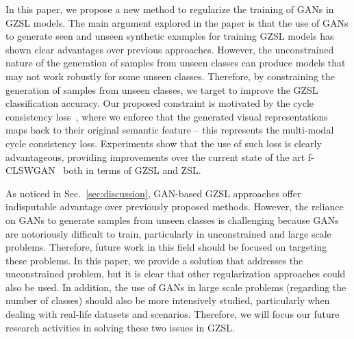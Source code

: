 \documentclass[runningheads]{llncs}
\begin{document}
In this paper, we propose a new method to regularize the training of GANs in GZSL models.  The main argument explored in the paper is that the use of GANs to generate seen and unseen synthetic examples for training GZSL models has shown clear advantages over previous approaches.  However, the unconstrained nature of the generation of samples from unseen classes can produce models that may not work robustly for some unseen classes.  Therefore, by constraining the generation of samples from unseen classes, we target to improve the GZSL classification accuracy.  Our proposed constraint is motivated by the cycle consistency loss~\cite{CycleGAN2017}, where we enforce that the generated visual representations maps back to their original semantic feature -- this represents the multi-modal cycle consistency loss.
Experiments show that the use of such loss is clearly advantageous, providing improvements over the current state of the art f-CLSWGAN~\cite{XianCVPR2018} both in terms of GZSL and ZSL.

As noticed in Sec.~\ref{sec:discussion}, GAN-based GZSL approaches offer indisputable advantage over previously proposed methods.  However, the reliance on GANs to generate samples from unseen classes is challenging because GANs are notoriously difficult to train, particularly in unconstrained and large scale problems.  Therefore, future work in this field should be focused on targeting these problems.  In this paper, we provide a solution that addresses the unconstrained problem, but it is clear that other regularization approaches could also be used.  In addition, the use of GANs in large scale problems (regarding the number of classes) should also be more intensively studied, particularly when dealing with real-life datasets and scenarios.  Therefore, we will focus our future research activities in solving these two issues in GZSL.


%
%
%
%
%
%
%


\end{document}
